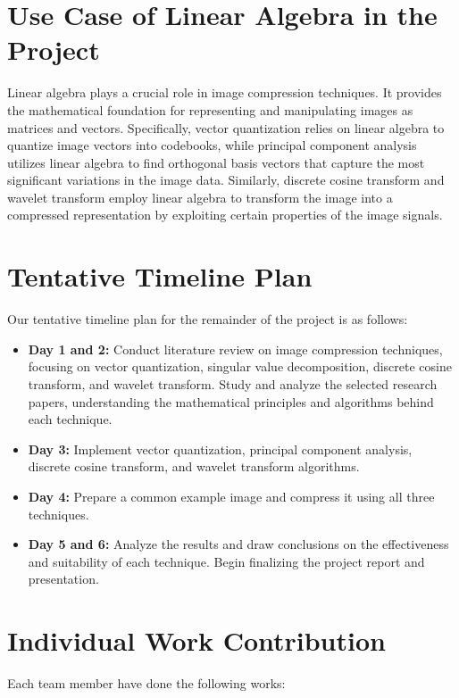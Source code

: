 \documentclass{article}
\begin{document}
\section{Use Case of Linear Algebra in the Project}
Linear algebra plays a crucial role in image compression techniques. It provides the mathematical foundation for representing and manipulating images as matrices and vectors. Specifically, vector quantization relies on linear algebra to quantize image vectors into codebooks, while principal component analysis utilizes linear algebra to find orthogonal basis vectors that capture the most significant variations in the image data. Similarly, discrete cosine transform and wavelet transform employ linear algebra to transform the image into a compressed representation by exploiting certain properties of the image signals.

\section{Tentative Timeline Plan}
Our tentative timeline plan for the remainder of the project is as follows:

\begin{itemize}
    \item \textbf{Day 1 and 2:} Conduct literature review on image compression techniques, focusing on vector quantization, singular value decomposition, discrete cosine transform, and wavelet transform. Study and analyze the selected research papers, understanding the mathematical principles and algorithms behind each technique.
    \item \textbf{Day 3:} Implement vector quantization, principal component analysis, discrete cosine transform, and wavelet transform algorithms.
    \item \textbf{Day 4:} Prepare a common example image and compress it using all three techniques.
    \item \textbf{Day 5 and 6:} Analyze the results and draw conclusions on the effectiveness and suitability of each technique. Begin finalizing the project report and presentation.
\end{itemize}

\section{Individual Work Contribution}
Each team member have done the following works:
\end{document}
